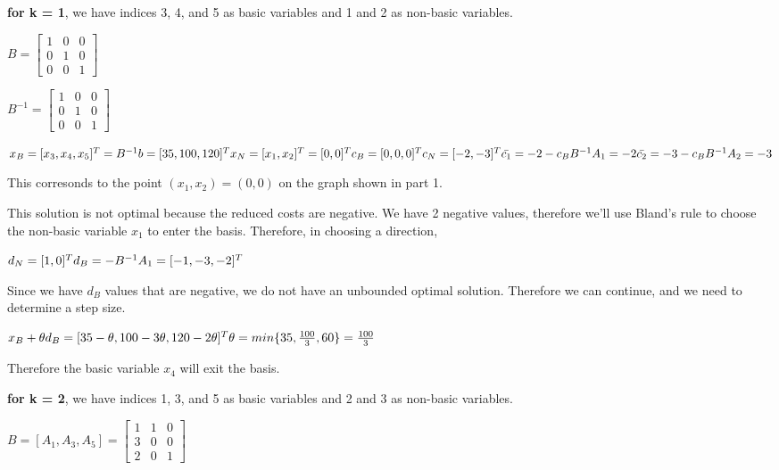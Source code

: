 \documentclass[11pt]{article}
\begin{document}
    \textbf{for k = 1}, we have indices 3, 4, and 5 as basic variables and 1
and 2 as non-basic variables.

\(B = \begin{bmatrix} 1 & 0 & 0 \\ 0 & 1 & 0 \\ 0 & 0 & 1 \end{bmatrix}\)

\(B^{-1} = \begin{bmatrix} 1 & 0 & 0 \\ 0 & 1 & 0 \\ 0 & 0 & 1 \end{bmatrix}\)

\(x_B = [x_3, x_4, x_5]^T = B^{-1}b = [35, 100, 120]^ T \\ x_N = [x_1, x_2]^T = [0, 0]^T \\ c_B = [0, 0, 0]^T \\ c_N = [-2, -3]^T \\ \bar{c_1} = -2 - c_B B^{-1} A_1 = -2 \\ \bar{c_2} = -3 - c_B B^{-1} A_2 = -3\)

This corresonds to the point \((x_1, x_2) = (0, 0)\) on the graph shown
in part 1.

This solution is not optimal because the reduced costs are negative. We
have 2 negative values, therefore we'll use Bland's rule to choose the
non-basic variable \(x_1\) to enter the basis. Therefore, in choosing a
direction,

\(d_N = [1, 0]^T \\ d_B = -B^{-1} A_1 = [-1, -3, -2]^T\)

Since we have \(d_B\) values that are negative, we do not have an
unbounded optimal solution. Therefore we can continue, and we need to
determine a step size.

\(x_B + \theta d_B = [35 - \theta, 100 - 3\theta, 120 - 2\theta]^T \\ \theta = min \{35, \frac{100}{3}, 60 \} = \frac{100}{3}\)

Therefore the basic variable \(x_4\) will exit the basis.

    \textbf{for k = 2}, we have indices 1, 3, and 5 as basic variables and 2
and 3 as non-basic variables.

\(B = [A_1, A_3, A_5] = \begin{bmatrix} 1 & 1 & 0 \\ 3 & 0 & 0 \\ 2 & 0 & 1 \end{bmatrix}\)
\end{document}
